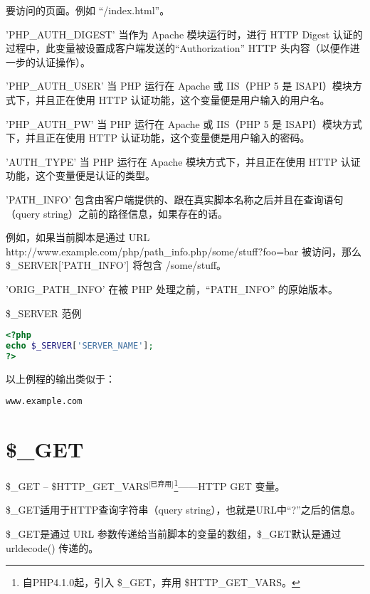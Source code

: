 \begin{compactitem}
要访问的页面。例如 “/index.html”。
\item 'PHP\_AUTH\_DIGEST'
当作为 Apache 模块运行时，进行 HTTP Digest 认证的过程中，此变量被设置成客户端发送的“Authorization” HTTP 头内容（以便作进一步的认证操作）。
\item 'PHP\_AUTH\_USER'
当 PHP 运行在 Apache 或 IIS（PHP 5 是 ISAPI）模块方式下，并且正在使用 HTTP 认证功能，这个变量便是用户输入的用户名。
\item 'PHP\_AUTH\_PW'
当 PHP 运行在 Apache 或 IIS（PHP 5 是 ISAPI）模块方式下，并且正在使用 HTTP 认证功能，这个变量便是用户输入的密码。
\item 'AUTH\_TYPE'
当 PHP 运行在 Apache 模块方式下，并且正在使用 HTTP 认证功能，这个变量便是认证的类型。
\item 'PATH\_INFO'
包含由客户端提供的、跟在真实脚本名称之后并且在查询语句（query string）之前的路径信息，如果存在的话。

例如，如果当前脚本是通过 URL http://www.example.com/php/path\_info.php/some/stuff?foo=bar 被访问，那么 \$\_SERVER['PATH\_INFO'] 将包含 /some/stuff。
\item 'ORIG\_PATH\_INFO'
在被 PHP 处理之前，“PATH\_INFO” 的原始版本。
\end{compactitem}

\begin{example}
\$\_SERVER 范例
\begin{lstlisting}[language=PHP]
<?php
echo $_SERVER['SERVER_NAME'];
?>
\end{lstlisting}
\end{example}

以上例程的输出类似于：

\begin{verbatim}
www.example.com
\end{verbatim}


\section{\$\_GET}



\$\_GET -- \$HTTP\_GET\_VARS$^{\text{[已弃用]}}$\footnote{自PHP4.1.0起，引入 \$\_GET，弃用 \$HTTP\_GET\_VARS。}——HTTP GET 变量。

\begin{compactitem}
\item \$\_GET适用于HTTP查询字符串（query string），也就是URL中“?”之后的信息。
\item \$\_GET是通过 URL 参数传递给当前脚本的变量的数组，\$\_GET默认是通过 urldecode() 传递的。
\end{compactitem}


